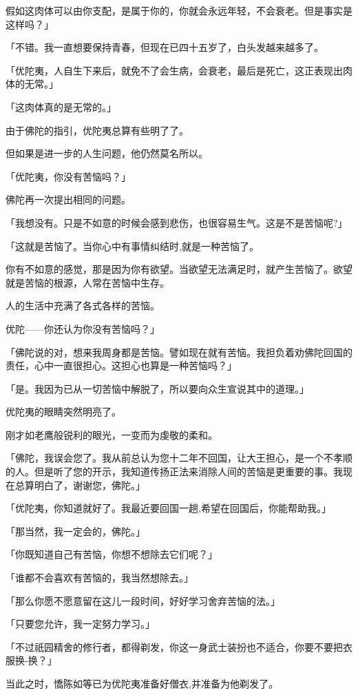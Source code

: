 \documentclass[twoside,openany]{book}
\begin{document}
假如这肉体可以由你支配，是属于你的，你就会永远年轻，不会衰老。但是事实是这样吗？」

「不错。我一直想要保持青春，但现在已四十五岁了，白头发越来越多了。

「优陀夷，人自生下来后，就免不了会生病，会衰老，最后是死亡，这正表现出肉体的无常。」

「这肉体真的是无常的。」

由于佛陀的指引，优陀夷总算有些明了了。

但如果是进一步的人生问题，他仍然莫名所以。

「优陀夷，你没有苦恼吗？」

佛陀再一次提出相同的问题。

「我想没有。只是不如意的时候会感到悲伤，也很容易生气。这是不是苦恼呢?」

「这就是苦恼了。当你心中有事情纠结时,就是一种苦恼了。

你有不如意的感觉，那是因为你有欲望。当欲望无法满足时，就产生苦恼了。欲望就是苦恼的根源，人常在苦恼中生存。

人的生活中充满了各式各样的苦恼。

优陀——你还认为你没有苦恼吗？」

「佛陀说的对，想来我周身都是苦恼。譬如现在就有苦恼。我担负着劝佛陀回国的责任，心中一直很担心。这担心也算是一种苦恼吗？」

「是。我因为已从一切苦恼中解脱了，所以要向众生宣说其中的道理。」

优陀夷的眼睛突然明亮了。

刚才如老鹰般锐利的眼光，一变而为虔敬的柔和。

「佛陀，我误会您了。我从前总认为您十二年不回国，让大王担心，是一个不孝顺的人。但是听了您的开示，我知道传扬正法来消除人间的苦恼是更重要的事。我现在总算明白了，谢谢您，佛陀。」

「优陀夷，你知道就好了。我最近要回国一趟,希望在回国后，你能帮助我。」

「那当然，我一定会的，佛陀。」

「你既知道自己有苦恼，你想不想除去它们呢？」

「谁都不会喜欢有苦恼的，我当然想除去。」

「那么你愿不愿意留在这儿一段时间，好好学习舍弃苦恼的法。」

「只要您允许，我一定努力学习。」

「不过祇园精舍的修行者，都得剃发，你这一身武士装扮也不适合，你要不要把衣服换-换？」

当此之时，憍陈如等已为优陀夷准备好僧衣,并准备为他剃发了。
\end{document}
